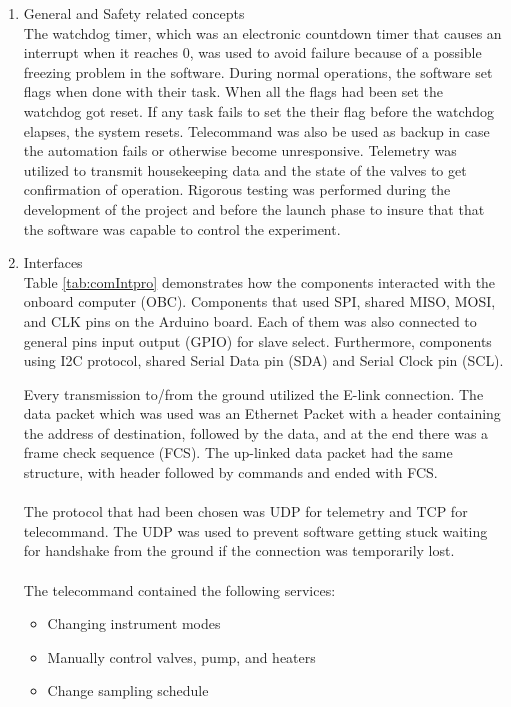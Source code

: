 \begin{enumerate}[label=(\alph*)]
\item{General and Safety related concepts}\\
The watchdog timer, which was an electronic countdown timer that causes an interrupt when it reaches 0, was used to avoid failure because of a possible freezing problem in the software. During normal operations, the software set flags when done with their task. When all the flags had been set the watchdog got reset. If any task fails to set the their flag before the watchdog elapses, the system resets. Telecommand was also be used as backup in case the automation fails or otherwise become unresponsive. Telemetry was utilized to transmit housekeeping data and the state of the valves to get confirmation of operation. Rigorous testing was performed during the development of the project and before the launch phase to insure that that the software was capable to control the experiment.
\item{Interfaces}\\
Table \ref{tab:comIntpro} demonstrates how the components interacted with the onboard computer (OBC). Components that used SPI, shared MISO, MOSI, and CLK pins on the Arduino board. Each of them was also connected to general pins input output (GPIO) for slave select. Furthermore, components using I2C protocol, shared Serial Data pin (SDA) and Serial Clock pin (SCL).



Every transmission to/from the ground utilized the E-link connection. The data packet which was used was an Ethernet Packet with a header containing the address of destination, followed by the data, and at the end there was a frame check sequence (FCS). The up-linked data packet had the same structure, with header followed by commands and ended with FCS.\\
\\
The protocol that had been chosen was UDP for telemetry and TCP for telecommand. The UDP was used to prevent software getting stuck waiting for handshake from the ground if the connection was temporarily lost.\\
\\
The telecommand contained the following services:
\begin{itemize}
    \item Changing instrument modes
    \item Manually control valves, pump, and heaters
    \item Change sampling schedule
\end{itemize}


\end{enumerate}
